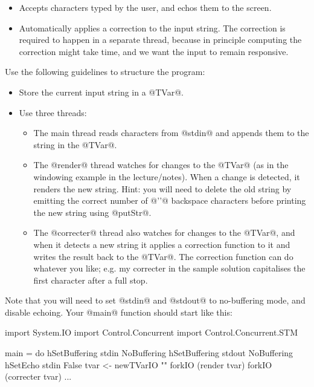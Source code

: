 \documentclass[11pt,a4paper]{article}
\begin{document}
\begin{itemize}
\item Accepts characters typed by the user, and echos them to the screen.

\item Automatically applies a correction to the input string.  The
correction is required to happen in a separate thread, because in
principle computing the correction might take time, and we want the
input to remain responsive.
\end{itemize}

Use the following guidelines to structure the program:

\begin{itemize}
\item Store the current input string in a @TVar@.
\item Use three threads:
      \begin{itemize}
      \item The main thread reads characters from @stdin@ and appends
      them to the string in the @TVar@.

      \item The @render@ thread watches for changes to the @TVar@ (as
      in the windowing example in the lecture/notes).  When a change
      is detected, it renders the new string.  Hint: you will need to
      delete the old string by emitting the correct number of @'\8'@
      backspace characters before printing the new string using
      @putStr@.

      \item The @correcter@ thread also watches for changes to the
      @TVar@, and when it detects a new string it applies a correction
      function to it and writes the result back to the @TVar@.  The
      correction function can do whatever you like; e.g. my correcter
      in the sample solution capitalises the first character after a
      full stop.
      \end{itemize}
\end{itemize}

Note that you will need to set @stdin@ and @stdout@ to no-buffering
mode, and disable echoing.  Your @main@ function should start like
this:

\begin{haskell}
import System.IO
import Control.Concurrent
import Control.Concurrent.STM

main = do
  hSetBuffering stdin  NoBuffering
  hSetBuffering stdout NoBuffering
  hSetEcho stdin False
  tvar <- newTVarIO ""
  forkIO (render tvar)
  forkIO (correcter tvar)
  ...
\end{haskell}
\end{document}
